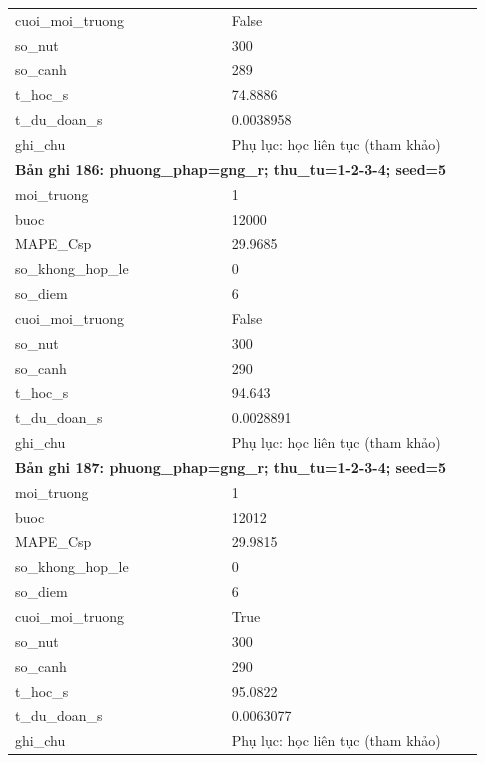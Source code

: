 \begin{longtable}{p{0.43\linewidth}p{0.50\linewidth}}
cuoi\_\allowbreak moi\_\allowbreak truong & False \\
so\_\allowbreak nut & 300 \\
so\_\allowbreak canh & 289 \\
t\_\allowbreak hoc\_\allowbreak s & 74.8886 \\
t\_\allowbreak du\_\allowbreak doan\_\allowbreak s & 0.0038958 \\
ghi\_\allowbreak chu & Phụ lục: học liên tục (tham khảo) \\
\midrule
\multicolumn{2}{p{0.95\linewidth}}{\textbf{Bản ghi 186: phuong\_phap=gng\_r; thu\_tu=1-2-3-4; seed=5}} \\
moi\_\allowbreak truong & 1 \\
buoc & 12000 \\
MAPE\_\allowbreak Csp & 29.9685 \\
so\_\allowbreak khong\_\allowbreak hop\_\allowbreak le & 0 \\
so\_\allowbreak diem & 6 \\
cuoi\_\allowbreak moi\_\allowbreak truong & False \\
so\_\allowbreak nut & 300 \\
so\_\allowbreak canh & 290 \\
t\_\allowbreak hoc\_\allowbreak s & 94.643 \\
t\_\allowbreak du\_\allowbreak doan\_\allowbreak s & 0.0028891 \\
ghi\_\allowbreak chu & Phụ lục: học liên tục (tham khảo) \\
\midrule
\multicolumn{2}{p{0.95\linewidth}}{\textbf{Bản ghi 187: phuong\_phap=gng\_r; thu\_tu=1-2-3-4; seed=5}} \\
moi\_\allowbreak truong & 1 \\
buoc & 12012 \\
MAPE\_\allowbreak Csp & 29.9815 \\
so\_\allowbreak khong\_\allowbreak hop\_\allowbreak le & 0 \\
so\_\allowbreak diem & 6 \\
cuoi\_\allowbreak moi\_\allowbreak truong & True \\
so\_\allowbreak nut & 300 \\
so\_\allowbreak canh & 290 \\
t\_\allowbreak hoc\_\allowbreak s & 95.0822 \\
t\_\allowbreak du\_\allowbreak doan\_\allowbreak s & 0.0063077 \\
ghi\_\allowbreak chu & Phụ lục: học liên tục (tham khảo) \\

\end{longtable}
